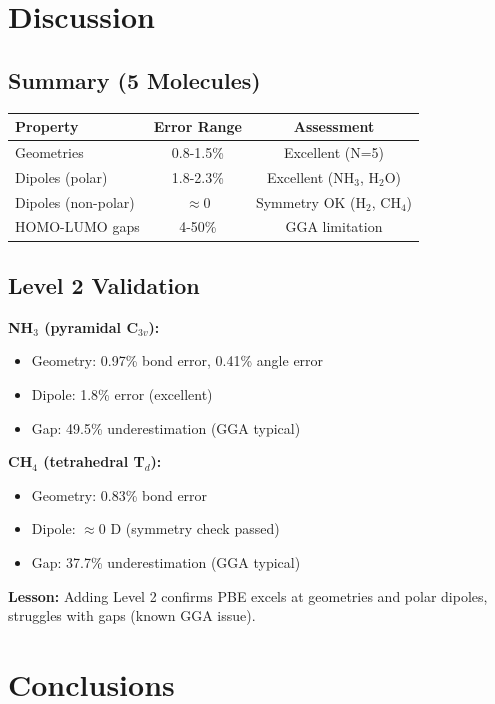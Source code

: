 \documentclass[11pt,a4paper]{article}
\begin{document}
\section{Discussion}

\subsection{Summary (5 Molecules)}

\begin{table}[h]
\centering
\begin{tabular}{lcc}
\toprule
\textbf{Property} & \textbf{Error Range} & \textbf{Assessment} \\
\midrule
Geometries & 0.8-1.5\% & Excellent (N=5) \\
Dipoles (polar) & 1.8-2.3\% & Excellent (NH$_3$, H$_2$O) \\
Dipoles (non-polar) & $\approx$0 & Symmetry OK (H$_2$, CH$_4$) \\
HOMO-LUMO gaps & 4-50\% & GGA limitation \\
\bottomrule
\end{tabular}
\end{table}

\subsection{Level 2 Validation}

\textbf{NH$_3$ (pyramidal C$_{3v}$):}
\begin{itemize}
    \item Geometry: 0.97\% bond error, 0.41\% angle error
    \item Dipole: 1.8\% error (excellent)
    \item Gap: 49.5\% underestimation (GGA typical)
\end{itemize}

\textbf{CH$_4$ (tetrahedral T$_d$):}
\begin{itemize}
    \item Geometry: 0.83\% bond error
    \item Dipole: $\approx$0 D (symmetry check passed)
    \item Gap: 37.7\% underestimation (GGA typical)
\end{itemize}

\textbf{Lesson:} Adding Level 2 confirms PBE excels at geometries and polar dipoles, struggles with gaps (known GGA issue).

\section{Conclusions}
\end{document}

